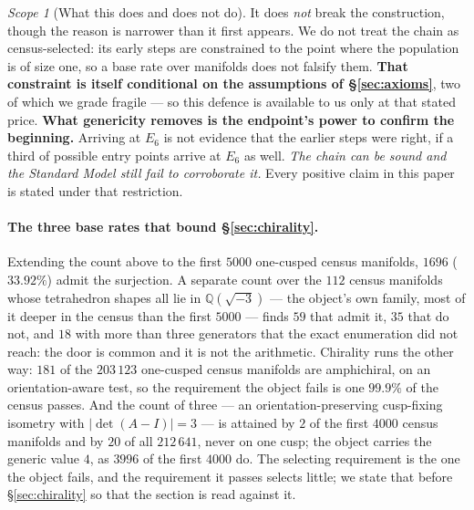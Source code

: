 \documentclass[11pt,a4paper]{article}
\theoremstyle{definition}
\theoremstyle{remark}
\newtheorem{scopenote}{Scope}
\newcommand{\Q}{\mathbb{Q}}
\begin{document}
\begin{scopenote}[What this does and does not do]
It does \emph{not} break the construction, though the reason is narrower than it first appears. We
do not treat the chain as census-selected: its early steps are constrained to the point where the
population is of size one, so a base rate over manifolds does not falsify them. \textbf{That
constraint is itself conditional on the assumptions of \S\ref{sec:axioms}}, two of which we grade
fragile --- so this defence is available to us only at that stated price. \textbf{What genericity removes is the endpoint's power to confirm the beginning.}
Arriving at $E_6$ is not evidence that the earlier steps were right, if a third of possible entry
points arrive at $E_6$ as well. \emph{The chain can be sound and the Standard Model still fail to
corroborate it.} Every positive claim in this paper is stated under that restriction.
\paragraph{The three base rates that bound \S\ref{sec:chirality}.} Extending the count above to the first $5000$ one-cusped census manifolds, $1696$ ($33.92\%$) admit the surjection. A separate count over the $112$ census manifolds whose tetrahedron shapes all lie in $\Q(\sqrt{-3})$ --- the object's own family, most of it deeper in the census than the first $5000$ --- finds $59$ that admit it, $35$ that do not, and $18$ with more than three generators that the exact enumeration did not reach: the door is common and it is not the arithmetic. Chirality runs the other way: $181$ of the $203\,123$ one-cusped census manifolds are amphichiral, on an orientation-aware test, so the requirement the object fails is one $99.9\%$ of the census passes. And the count of three --- an orientation-preserving cusp-fixing isometry with $|\det(A-I)| = 3$ --- is attained by $2$ of the first $4000$ census manifolds and by $20$ of all $212\,641$, never on one cusp; the object carries the generic value $4$, as $3996$ of the first $4000$ do. The selecting requirement is the one the object fails, and the requirement it passes selects little; we state that before \S\ref{sec:chirality} so that the section is read against it.
\end{scopenote}
\end{document}
